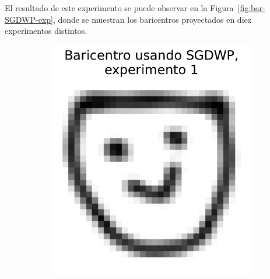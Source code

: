 El resultado de este experimento se puede observar en la Figura~\ref{fig:bar-SGDWP-exp}, donde se muestran los baricentros proyectados en diez experimentos distintos.
\begin{figure}[H]
    \centering
    \begin{subfigure}[b]{0.17\textwidth}
        \centering
        \includegraphics[width=\textwidth]{img/sgdwp/bar-SGDWP-exp-01.pdf}
        \label{fig:bar-SGDWP-exp-01}
    \end{subfigure}
    \hfill
    \begin{subfigure}[b]{0.17\textwidth}
        \centering

\end{subfigure}
\end{figure}
